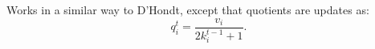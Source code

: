\documentclass[preview, border={0pt 2pt 1pt 1pt}, varwidth=16.3cm]{standalone} %
\begin{document}









    Works in a similar way to D'Hondt, except that quotients are updates as:
    \[
        q_i^t = \frac{v_i}{2k_i^{t-1} + 1}.
    \]
\end{document}
